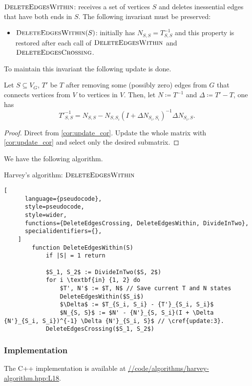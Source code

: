 \(\textsc{DeleteEdgesWithin}\): receives a set of vertices \(S\) and deletes inessential edges that have both ends in \(S\).
The following invariant must be preserved:
\begin{itemize}
    \item \(\textsc{DeleteEdgesWithin}(S)\): initially has \(N_{S, S} = T^{-1}_{S, S}\) and this property is restored after each call of \(\textsc{DeleteEdgesWithin}\)
    and \(\textsc{DeleteEdgesCrossing}\).
\end{itemize}
To maintain this invariant the following update is done.
\begin{theorem}[Update 3]
\label{update:3}
    Let \(S \subseteq V_G\), \(T'\) be \(T\) after removing some (possibly zero) edges from \(G\) that connects vertices from \(V\) to vertices in \(V\).
    Then, let \(N \coloneqq T^{-1}\) and \(\Delta \coloneqq T' - T\), one has
    \[
        {T'}^{-1}_{S, S} = N_{S, S} - N_{S, S_i}(I + \Delta N_{S_i, S_i})^{-1} \Delta N_{S_i, S}.
    \]
\end{theorem}

\begin{proof}
    Direct from \cref{cor:update_cor}. Update the whole matrix with \ref{cor:update_cor} and select only the desired submatrix.
\end{proof}

We have the following algorithm.

\begin{programruledcaption}{Harvey's algorithm: \(\textsc{DeleteEdgesWithin}\)}
    \begin{lstlisting}[
      language={pseudocode},
      style=pseudocode,
      style=wider,
      functions={DeleteEdgesCrossing, DeleteEdgesWithin, DivideInTwo},
      specialidentifiers={},
    ]
        function DeleteEdgesWithin(S)
            if |S| = 1 return

            $S_1, S_2$ := DivideInTwo($S, 2$)
            for i \textbf{in} {1, 2} do
                $T', N'$ := $T, N$ // Save current T and N states
                DeleteEdgesWithin($S_i$)
                $\Delta$ := $T_{S_i, S_i} - {T'}_{S_i, S_i}$
                $N_{S, S}$ := $N' - {N'}_{S, S_i}(I + \Delta {N'}_{S_i, S_i})^{-1} \Delta {N'}_{S_i, S}$ // \cref{update:3}. 
            DeleteEdgesCrossing($S_1, S_2$)
    \end{lstlisting}
\end{programruledcaption}

\subsubsection{Implementation}
\noindent
The C++ implementation is available at 
\href{https://github.com/antoniomsah/algebraic-max-matching/blob/main/code/algorithms/harvey-algorithm.hpp#L18}{//code/algorithms/harvey-algorithm.hpp:L18}.

